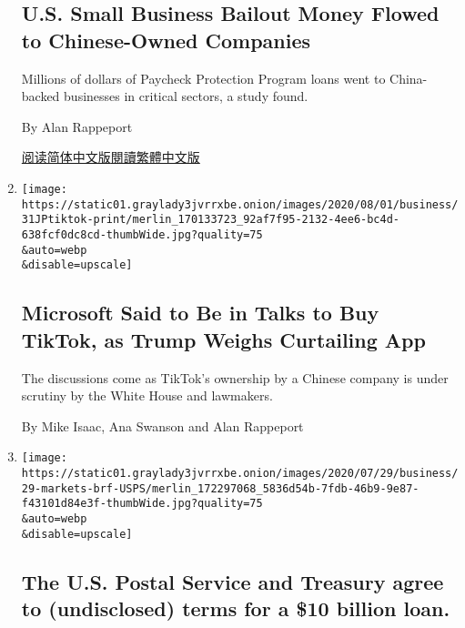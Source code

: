 \begin{enumerate}
{  \subsection{U.S. Small Business Bailout Money Flowed to Chinese-Owned
  Companies}\label{us-small-business-bailout-money-flowed-to-chinese-owned-companies}}

  Millions of dollars of Paycheck Protection Program loans went to
  China-backed businesses in critical sectors, a study found.

  By Alan Rappeport

  \href{https://cn.nytimes3xbfgragh.onion/usa/20200803/virus-china-ppp-small-business-loans/}{阅读简体中文版}\href{https://cn.nytimes3xbfgragh.onion/usa/20200803/virus-china-ppp-small-business-loans/zh-hant/}{閱讀繁體中文版}
\item
  \href{/2020/07/31/technology/tiktok-microsoft.html}{}

  \texttt{[image: https://static01.graylady3jvrrxbe.onion/images/2020/08/01/business/31JPtiktok-print/merlin\_170133723\_92af7f95-2132-4ee6-bc4d-638fcf0dc8cd-thumbWide.jpg?quality=75\\\&auto=webp\\\&disable=upscale]}

  \hypertarget{microsoft-said-to-be-in-talks-to-buy-tiktok-as-trump-weighs-curtailing-app}{%
  \subsection{Microsoft Said to Be in Talks to Buy TikTok, as Trump
  Weighs Curtailing
  App}\label{microsoft-said-to-be-in-talks-to-buy-tiktok-as-trump-weighs-curtailing-app}}

  The discussions come as TikTok's ownership by a Chinese company is
  under scrutiny by the White House and lawmakers.

  By Mike Isaac, Ana Swanson and Alan Rappeport
\item
  \href{/live/2020/07/29/business/stock-market-today-coronavirus/the-us-postal-service-and-treasury-agree-to-undisclosed-terms-for-a-10-billion-loan}{}

  \texttt{[image: https://static01.graylady3jvrrxbe.onion/images/2020/07/29/business/29-markets-brf-USPS/merlin\_172297068\_5836d54b-7fdb-46b9-9e87-f43101d84e3f-thumbWide.jpg?quality=75\\\&auto=webp\\\&disable=upscale]}

  \hypertarget{the-us-postal-service-and-treasury-agree-to-undisclosed-terms-for-a-10-billion-loan}{%
  \subsection{The U.S. Postal Service and Treasury agree to
  (undisclosed) terms for a \$10 billion
  loan.}\label{the-us-postal-service-and-treasury-agree-to-undisclosed-terms-for-a-10-billion-loan}}


\end{enumerate}
